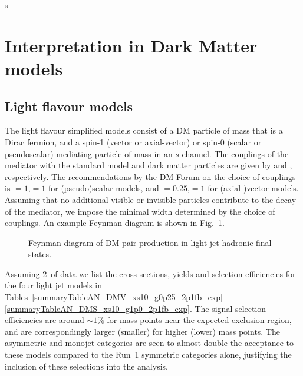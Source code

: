 s%
\section{Interpretation in Dark Matter models} \label{sec:darkmatter}



\subsection{Light flavour models} \label{sec:dm_lightjet}

The light flavour simplified models consist of a DM particle \pchi of mass
\mchi that is a Dirac fermion, and a spin-1 (vector or axial-vector) or spin-0
(scalar or pseudoscalar) mediating particle \pphi of mass \mphi in an
$s$-channel. The couplings of the mediator with the standard model and dark
matter particles are given by \gsm and \gdm, respectively. The recommendations
by the DM Forum on the choice of couplings is \gsm$=1$,\gdm$=1$ for
(pseudo)scalar models, and \gsm$=0.25$,\gdm$=1$ for (axial-)vector models.
Assuming that no additional visible or invisible particles contribute to the decay 
of the mediator, we impose the minimal width determined by the choice of couplings. 
An example Feynman diagram is shown in Fig.~\ref{fig:DMfeynman}.


\begin{figure}[h!] \centering
  \caption{Feynman diagram of DM pair production in light jet hadronic final states. \cite{Abercrombie:2015wmb}}
  \label{fig:DMfeynman} 
\end{figure}



Assuming 2~\ifb of data we list the cross sections, yields and selection 
efficiencies for the four light jet models in Tables~\ref{summaryTableAN_DMV_xs10_g0p25_2p1fb_exp}-\ref{summaryTableAN_DMS_xs10_g1p0_2p1fb_exp}. The signal selection
efficiencies are around $\sim 1$\% for mass points near the expected exclusion
region, and are correspondingly larger (smaller) for higher (lower) mass points.
The asymmetric and monojet categories are seen to almost double the acceptance
to these models compared to the Run~1 symmetric categories alone, justifying the
inclusion of these selections into the analysis.




